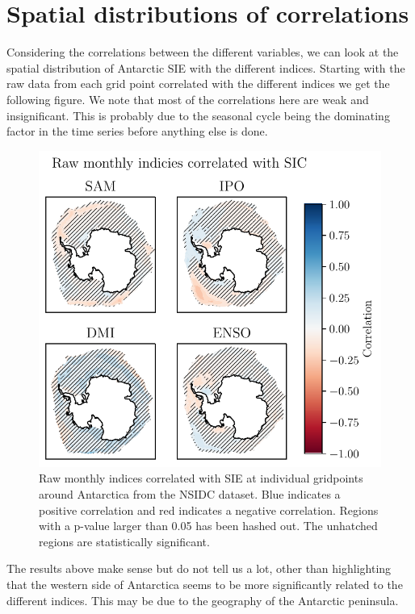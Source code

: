 \section{Spatial distributions of correlations}
Considering the correlations between the different variables, we can look at the spatial distribution of Antarctic SIE with the different indices. Starting with the raw data from each grid point correlated with the different indices we get the following figure. We note that most of the correlations here are weak and insignificant. This is probably due to the seasonal cycle being the dominating factor in the time series before anything else is done.
\begin{figure}[H]
    \centering
    \includegraphics{images_v2/correlations/spatial/raw_monthly_raw_1_nsidc.pdf}
    \caption[Raw monthly indices correlated with SIE at individual gridpoints around Antarctica.]{Raw monthly indices correlated with SIE at individual gridpoints around Antarctica from the NSIDC dataset. Blue indicates a positive correlation and red indicates a negative correlation. Regions with a p-value larger than 0.05 has been hashed out. The unhatched regions are statistically significant.}
    \label{fig:my_label}
\end{figure}

The results above make sense but do not tell us a lot, other than highlighting that the western side of Antarctica seems to be more significantly related to the different indices. This may be due to the geography of the Antarctic peninsula.